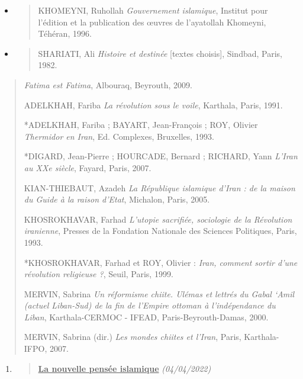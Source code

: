 \begin{itemize}
\item
  \begin{quote}
  KHOMEYNI, Ruhollah \emph{Gouvernement islamique}, Institut pour
  l'édition et la publication des œuvres de l'ayatollah Khomeyni,
  Téhéran, 1996.
  \end{quote}
\item
  \begin{quote}
  SHARIATI, Ali \emph{Histoire et destinée} {[}textes choisis{]},
  Sindbad, Paris, 1982.
  \end{quote}
\end{itemize}

\begin{quote}
\emph{Fatima est Fatima}, Albouraq, Beyrouth, 2009.

ADELKHAH, Fariba \emph{La révolution sous le voile}, Karthala, Paris,
1991.

*ADELKHAH, Fariba ; BAYART, Jean-François ; ROY, Olivier \emph{Thermidor
en Iran}, Ed. Complexes, Bruxelles, 1993.

*DIGARD, Jean-Pierre ; HOURCADE, Bernard ; RICHARD, Yann \emph{L'Iran au
XXe siècle}, Fayard, Paris, 2007.

KIAN-THIEBAUT, Azadeh \emph{La République islamique d'Iran : de la
maison du Guide à la raison d'Etat}, Michalon, Paris, 2005.

KHOSROKHAVAR, Farhad \emph{L'utopie sacrifiée, sociologie de la
Révolution iranienne}, Presses de la Fondation Nationale des Sciences
Politiques, Paris, 1993.

*KHOSROKHAVAR, Farhad et ROY, Olivier : \emph{Iran, comment sortir d'une
révolution religieuse ?}, Seuil, Paris, 1999.

MERVIN, Sabrina \emph{Un réformisme chiite. Ulémas et lettrés du Gabal
`Amil (actuel Liban-Sud) de la fin de l'Empire ottoman à l'indépendance
du Liban}, Karthala-CERMOC - IFEAD, Paris-Beyrouth-Damas, 2000.

MERVIN, Sabrina (dir.) \emph{Les mondes chiites et l'Iran}, Paris,
Karthala-IFPO, 2007.
\end{quote}

\begin{enumerate}
\def\labelenumi{\arabic{enumi}.}
\item
  \begin{quote}
  \textbf{\underline{La nouvelle pensée islamique}} \emph{(04/04/2022)}
  \end{quote}
\end{enumerate}


